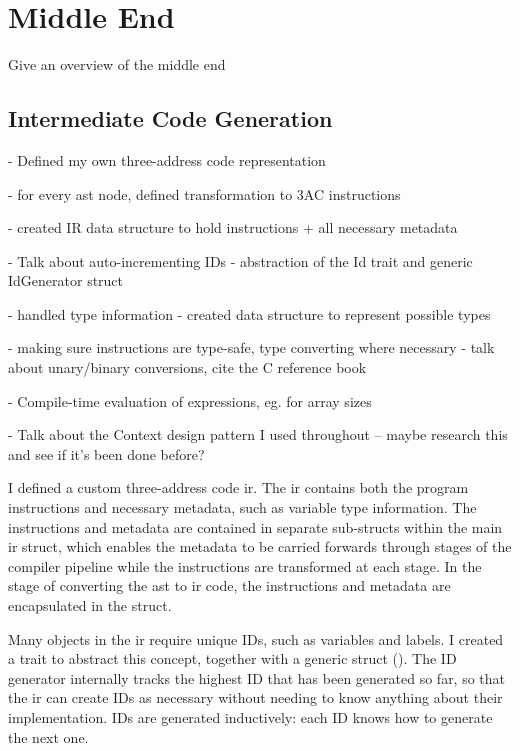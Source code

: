 \documentclass[00-main.tex]{subfiles}
\begin{document}
\section{Middle End}

\begin{mrwComment}
Give an overview of the middle end
\end{mrwComment}

\subsection{Intermediate Code Generation}

\begin{mrwComment}
- Defined my own three-address code representation

- for every ast node, defined transformation to 3AC instructions

- created IR data structure to hold instructions + all necessary metadata

- Talk about auto-incrementing IDs - abstraction of the Id trait and generic IdGenerator struct

- handled type information - created data structure to represent possible types

- making sure instructions are type-safe, type converting where necessary - talk about unary/binary conversions, cite the C reference book

- Compile-time evaluation of expressions, eg. for array sizes

- Talk about the Context design pattern I used throughout -- maybe research this and see if it's been done before?
\end{mrwComment}

I defined a custom three-address code \gls{ir}.
The \gls{ir} contains both the program instructions and necessary metadata, such as variable type information.
The instructions and metadata are contained in separate sub-structs within the main \gls{ir} struct, which enables the metadata to be carried forwards through stages of the compiler pipeline while the instructions are transformed at each stage.
In the stage of converting the \gls{ast} to \gls{ir} code, the instructions and metadata are encapsulated in the  struct.

Many objects in the \gls{ir} require unique IDs, such as variables and labels.
I created a  trait to abstract this concept, together with a generic  struct ().
The ID generator internally tracks the highest ID that has been generated so far, so that the \gls{ir} can create IDs as necessary without needing to know anything about their implementation.
IDs are generated inductively: each ID knows how to generate the next one.
\end{document}
